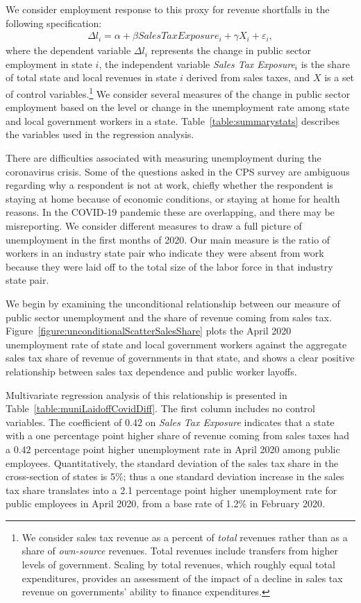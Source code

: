 We consider employment response to this proxy for revenue shortfalls in the following specification:
\begin{align*}
	\Delta l_{i} = \alpha + \beta SalesTaxExposure_i + {\gamma}X_i + \varepsilon_i,
\end{align*}
where the dependent variable $\Delta l_i$ represents the change in public sector employment in state $i$, the independent variable \emph{Sales Tax Exposure}$_i$ is the share of total state and local revenues in state $i$ derived from sales taxes, and $X$ is a set of control variables.\footnote{We consider sales tax revenue as a percent of \emph{total} revenues rather than as a share of \emph{own-source} revenues. Total revenues include transfers from higher levels of government. Scaling by total revenues, which roughly equal total expenditures, provides an assessment of the impact of a decline in sales tax revenue on governments' ability to finance expenditures.} We consider several measures of the change in public sector employment based on the level or change in the unemployment rate among state and local government workers in a state. Table~\ref{table:summarystats} describes the variables used in the regression analysis.

There are difficulties associated with measuring unemployment during the coronavirus crisis. Some of the questions asked in the CPS survey are ambiguous regarding why a respondent is not at work, chiefly whether the respondent is staying at home because of economic conditions, or staying at home for health reasons. In the COVID-19 pandemic these are overlapping, and there may be misreporting. 
We consider different measures to draw a full picture of unemployment in the first months of 2020. Our main measure is the ratio of workers in an industry state pair who indicate they were absent from work because they were laid off to the total size of the labor force in that industry state pair. 

We begin by examining the unconditional relationship between our measure of public sector unemployment and the share of revenue coming from sales tax. Figure~\ref{figure:unconditionalScatterSalesShare} plots the April 2020 unemployment rate of state and local government workers against the aggregate sales tax share of revenue of governments in that state, and shows a clear positive relationship between sales tax dependence and public worker layoffs. 

Multivariate regression analysis of this relationship is presented in Table~\ref{table:muniLaidoffCovidDiff}. The first column includes no control variables. The coefficient of $0.42$ on \emph{Sales Tax Exposure} indicates that a state with a one percentage point higher share of revenue coming from sales taxes had a $0.42$ percentage point higher unemployment rate in April 2020 among public employees. 
Quantitatively, the standard deviation of the sales tax share in the cross-section of states is 5\%; thus a one standard deviation increase in the sales tax share translates into a 2.1 percentage point higher unemployment rate for public employees in April 2020, from a base rate of 1.2\% in February 2020. 



